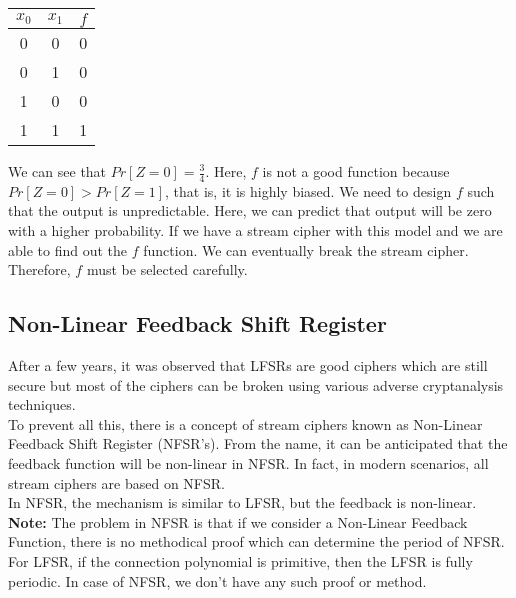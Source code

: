\documentclass[11pt]{article}
\begin{document}
\begin{table}[h]
\centering
  \begin{tabular}{c|c||c}
        \textbf{$x_0$} & \textbf{$x_1$} & \textbf{$f$} \\
        \hline
        0 & 0 & 0 \\
        0 & 1 & 0 \\
        1 & 0 & 0 \\
        1 & 1 & 1 \\
  \end{tabular}
\end{table}
We can see that $Pr[Z = 0] = \frac{3}{4}$. Here, $f$ is not a good function because $Pr[Z = 0] > Pr[Z = 1]$, that is, it is highly biased. We need to design $f$ such that the output is unpredictable. Here, we can predict that output will be zero with a higher probability. If we have a stream cipher with this model and we are able to find out the $f$ function. We can eventually break the stream cipher. Therefore, $f$ must be selected carefully.

\subsection{Non-Linear Feedback Shift Register}
After a few years, it was observed that LFSRs are good ciphers which are still secure but most of the ciphers can be broken using various adverse cryptanalysis techniques.\\
\newline
To prevent all this, there is a concept of stream ciphers known as Non-Linear Feedback Shift Register (NFSR's). From the name, it can be anticipated that the feedback function will be non-linear in NFSR. In fact, in modern scenarios, all stream ciphers are based on NFSR.\\
\newline
In NFSR, the mechanism is similar to LFSR, but the feedback is non-linear. \\
\textbf{Note: } The problem in NFSR is that if we consider a Non-Linear Feedback Function, there is no methodical proof which can determine the period of NFSR. For LFSR, if the connection polynomial is primitive, then the LFSR is fully periodic. In case of NFSR, we don't have any such proof or method.
\end{document}
